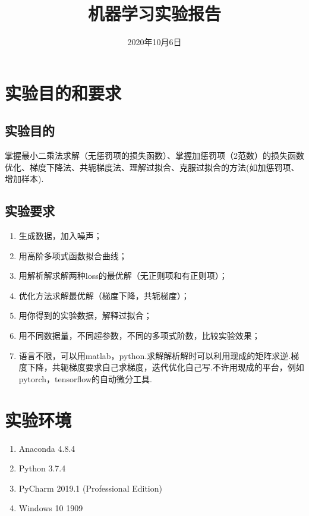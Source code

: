 \documentclass{hitreport}
\title{机器学习实验报告}
\date{2020年10月6日}
\begin{document}

\makecover


\section{实验目的和要求}

\subsection{实验目的}
掌握最小二乘法求解（无惩罚项的损失函数）、掌握加惩罚项（2范数）的损失函数优化、梯度下降法、共轭梯度法、理解过拟合、克服过拟合的方法(如加惩罚项、增加样本).

\subsection{实验要求}

\begin{enumerate}
\item 生成数据，加入噪声；
\item 用高阶多项式函数拟合曲线；
\item 用解析解求解两种loss的最优解（无正则项和有正则项）；
\item 优化方法求解最优解（梯度下降，共轭梯度）；
\item 用你得到的实验数据，解释过拟合；
\item 用不同数据量，不同超参数，不同的多项式阶数，比较实验效果；
\item 语言不限，可以用matlab，python.求解解析解时可以利用现成的矩阵求逆.梯度下降，共轭梯度要求自己求梯度，迭代优化自己写.不许用现成的平台，例如pytorch，tensorflow的自动微分工具.

\end{enumerate}


\section{实验环境}

\begin{enumerate}
\item Anaconda 4.8.4
\item Python 3.7.4
\item PyCharm 2019.1 (Professional Edition)
\item Windows 10 1909
\end{enumerate}
\end{document}

